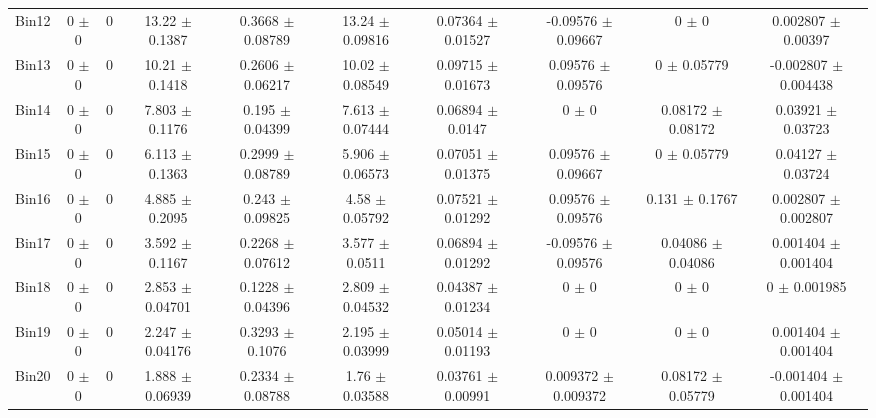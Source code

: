 \begin{tabular}{@{\extracolsep{4pt}}lccccccccc@{}}
     Bin12 & 0 $\pm$ 0 & 0 & 13.22 $\pm$ 0.1387 & 0.3668 $\pm$ 0.08789 & 13.24 $\pm$ 0.09816 & 0.07364 $\pm$ 0.01527 & -0.09576 $\pm$ 0.09667 & 0 $\pm$ 0 & 0.002807 $\pm$ 0.00397 \\ 
     Bin13 & 0 $\pm$ 0 & 0 & 10.21 $\pm$ 0.1418 & 0.2606 $\pm$ 0.06217 & 10.02 $\pm$ 0.08549 & 0.09715 $\pm$ 0.01673 & 0.09576 $\pm$ 0.09576 & 0 $\pm$ 0.05779 & -0.002807 $\pm$ 0.004438 \\ 
     Bin14 & 0 $\pm$ 0 & 0 & 7.803 $\pm$ 0.1176 & 0.195 $\pm$ 0.04399 & 7.613 $\pm$ 0.07444 & 0.06894 $\pm$ 0.0147 & 0 $\pm$ 0 & 0.08172 $\pm$ 0.08172 & 0.03921 $\pm$ 0.03723 \\ 
     Bin15 & 0 $\pm$ 0 & 0 & 6.113 $\pm$ 0.1363 & 0.2999 $\pm$ 0.08789 & 5.906 $\pm$ 0.06573 & 0.07051 $\pm$ 0.01375 & 0.09576 $\pm$ 0.09667 & 0 $\pm$ 0.05779 & 0.04127 $\pm$ 0.03724 \\ 
     Bin16 & 0 $\pm$ 0 & 0 & 4.885 $\pm$ 0.2095 & 0.243 $\pm$ 0.09825 & 4.58 $\pm$ 0.05792 & 0.07521 $\pm$ 0.01292 & 0.09576 $\pm$ 0.09576 & 0.131 $\pm$ 0.1767 & 0.002807 $\pm$ 0.002807 \\ 
     Bin17 & 0 $\pm$ 0 & 0 & 3.592 $\pm$ 0.1167 & 0.2268 $\pm$ 0.07612 & 3.577 $\pm$ 0.0511 & 0.06894 $\pm$ 0.01292 & -0.09576 $\pm$ 0.09576 & 0.04086 $\pm$ 0.04086 & 0.001404 $\pm$ 0.001404 \\ 
     Bin18 & 0 $\pm$ 0 & 0 & 2.853 $\pm$ 0.04701 & 0.1228 $\pm$ 0.04396 & 2.809 $\pm$ 0.04532 & 0.04387 $\pm$ 0.01234 & 0 $\pm$ 0 & 0 $\pm$ 0 & 0 $\pm$ 0.001985 \\ 
     Bin19 & 0 $\pm$ 0 & 0 & 2.247 $\pm$ 0.04176 & 0.3293 $\pm$ 0.1076 & 2.195 $\pm$ 0.03999 & 0.05014 $\pm$ 0.01193 & 0 $\pm$ 0 & 0 $\pm$ 0 & 0.001404 $\pm$ 0.001404 \\ 
     Bin20 & 0 $\pm$ 0 & 0 & 1.888 $\pm$ 0.06939 & 0.2334 $\pm$ 0.08788 & 1.76 $\pm$ 0.03588 & 0.03761 $\pm$ 0.00991 & 0.009372 $\pm$ 0.009372 & 0.08172 $\pm$ 0.05779 & -0.001404 $\pm$ 0.001404 \\ 
\hline\hline
  \end{tabular}
